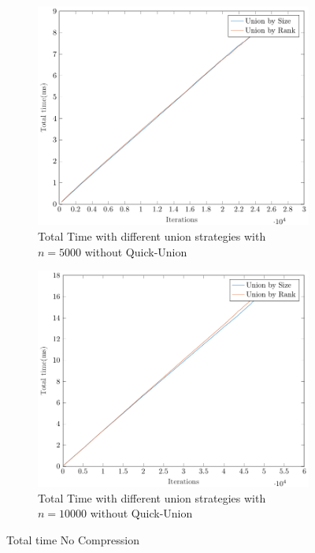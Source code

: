 \begin{figure}[ht]
    \hfill
    \begin{subfigure}{0.32\textwidth}
        \centering
        \includegraphics[width=\textwidth]{../images/plotNCNonFull5000_time(ms).pdf}
        \caption{Total Time with different union strategies with $n = 5000$ without Quick-Union}
    \end{subfigure}%
    \hfill
    \begin{subfigure}{0.32\textwidth}
        \centering
        \includegraphics[width=\textwidth]{../images/plotNCNonFull10000_time(ms).pdf}
        \caption{Total Time with different union strategies with $n = 10000$ without Quick-Union}
    \end{subfigure}

    \caption{Total time No Compression}
    \label{fig:timeNC}
\end{figure}
